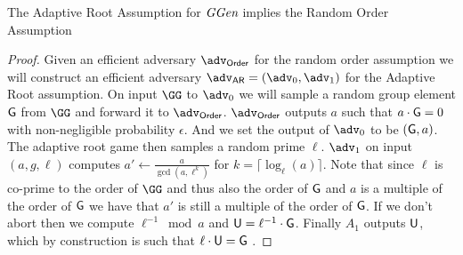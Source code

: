 \begin{lemma}
\label{lem:roa-to-ar}
	The Adaptive Root Assumption for $\textit{GGen}$ implies the Random Order Assumption
	\end{lemma}
	\begin{proof}
	Given an efficient adversary $\adv_{\textsf{Order}}$ for the random order assumption we will construct an efficient adversary $\adv_{\textsf{AR}}=(\adv_0,\adv_1)$ for the Adaptive Root assumption. On input $\GG$ to $\adv_{0}$ we will sample a random group element $\Generator$ from $\GG$ and forward it to $\adv_{\textsf{Order}}$. $\adv_{\textsf{Order}}$ outputs $a$ such that $a\cdot \Generator=0$ with non-negligible probability $\epsilon$. And we set the output of $\adv_0$ to be $(\Generator,a)$. The adaptive root game then samples a random prime $\ell$.
	$\adv_1$ on input $(a,g,\ell)$ computes $a'\gets \frac{a}{\gcd(a,\ell^k)}$ for $k=\lceil\log_\ell(a)\rceil$. Note that since $\ell$ is co-prime to the order of $\GG$ and thus also the order of $\Generator$ and $a$ is a multiple of the order of $\Generator$ we have that $a'$ is still a multiple of the order of $\Generator$. If we don't abort then we compute $\ell^{-1} \bmod a$ and $\gr{u}=\ell^{-1}\cdot \Generator$.
	Finally $A_1$ outputs $\gr{u}$, which by construction is such that $\ell\cdot \gr{u}=\gr{g}$ . 
	\end{proof}

